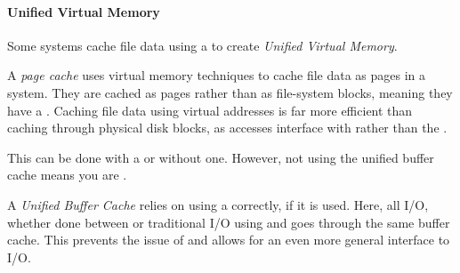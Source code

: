 \paragraph{Unified Virtual Memory}\label{par:Unified_Virtual_Memory}
Some systems cache file data using a  to create \emph{Unified Virtual Memory}.

\begin{definition}\label{def:Page_Cache}
  A \emph{page cache} uses virtual memory techniques to cache file data as pages in a  system.
  They are cached as pages rather than as file-system blocks, meaning they have a .
  Caching file data using virtual addresses is far more efficient than caching through physical disk blocks, as accesses interface with  rather than the .
\end{definition}

This can be done with a  or without one.
However, not using the unified buffer cache means you are .

\begin{definition}\label{def:Unified_Buffer_Cache}
  A \emph{Unified Buffer Cache} relies on using a  correctly, if it is used.
  Here, all I/O, whether done between  or traditional I/O using  and  goes through the same buffer cache.
  This prevents the issue of  and allows for an even more general interface to I/O.
\end{definition}


